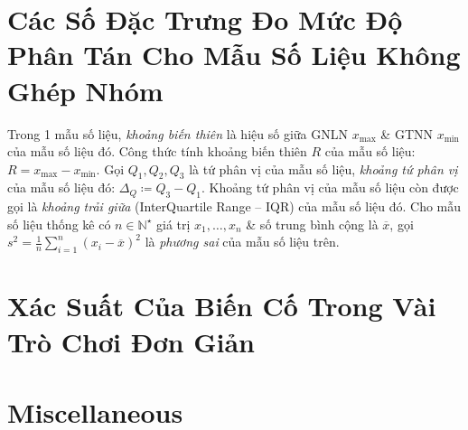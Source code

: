 \documentclass{article}
\begin{document}

\section{Các Số Đặc Trưng Đo Mức Độ Phân Tán Cho Mẫu Số Liệu Không Ghép Nhóm}
 Trong 1 mẫu số liệu, {\it khoảng biến thiên} là hiệu số giữa GNLN $x_{\max}$ \& GTNN $x_{\min}$ của mẫu số liệu đó. Công thức tính khoảng biến thiên $R$ của mẫu số liệu: $R = x_{\max} - x_{\min}$. Gọi $Q_1,Q_2,Q_3$ là tứ phân vị của mẫu số liệu, {\it khoảng tứ phân vị} của mẫu số liệu đó: $\Delta_Q\coloneqq Q_3 - Q_1$. Khoảng tứ phân vị của mẫu số liệu còn được gọi là {\it khoảng trải giữa} (InterQuartile Range -- IQR) của mẫu số liệu đó.  Cho mẫu số liệu thống kê có $n\in\mathbb{N}^\star$ giá trị $x_1,\ldots,x_n$ \& số trung bình cộng là $\overline{x}$, gọi $s^2 = \frac{1}{n}\sum_{i=1}^n (x_i - \overline{x})^2$ là {\it phương sai} của mẫu số liệu trên.


\section{Xác Suất Của Biến Cố Trong Vài Trò Chơi Đơn Giản}


\section{Miscellaneous}


\printbibliography[heading=bibintoc]
	
\end{document}
